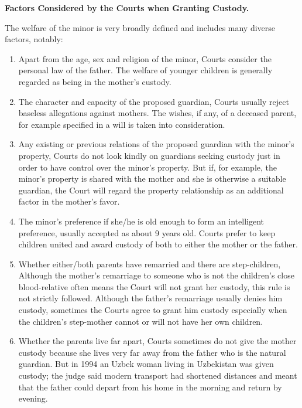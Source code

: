 \begin{multicols}{2}
{\normalsize\bfseries {Factors Considered by the Courts when Granting Custody.}}

\noi
The welfare of the minor is very broadly defined and includes many diverse factors, notably:

\begin{enumerate}
\item Apart from the age, sex and religion of the minor, Courts consider the personal law of the father. The welfare of younger children is generally regarded as being in the mother's custody.

\item The character and capacity of the proposed guardian, Courts usually reject baseless
allegations against mothers. The wishes, if any, of a deceased parent, for example
specified in a will is taken into consideration.

\item Any existing or previous relations of the proposed guardian with the minor's property,
Courts do not look kindly on guardians seeking custody just in order to have control over
the minor's property. But if, for example, the minor's property is shared with the mother
and she is otherwise a suitable guardian, the Court will regard the property relationship as
an additional factor in the mother's favor.

\item The minor's preference if she/he is old enough to form an intelligent preference, usually
accepted as about 9 years old. Courts prefer to keep children united and award custody of
both to either the mother or the father.

\item Whether either/both parents have remarried and there are step-children, Although the
mother's remarriage to someone who is not the children's close blood-relative often means
the Court will not grant her custody, this rule is not strictly followed. Although the father's
remarriage usually denies him custody, sometimes the Courts agree to grant him custody
especially when the children's step-mother cannot or will not have her own children.

\item Whether the parents live far apart, Courts sometimes do not give the mother custody
because she lives very far away from the father who is the natural guardian. But in 1994
an Uzbek woman living in Uzbekistan was given custody; the judge said modern transport
had shortened distances and meant that the father could depart from his home in the
morning and return by evening.


\end{enumerate}
\end{multicols}
